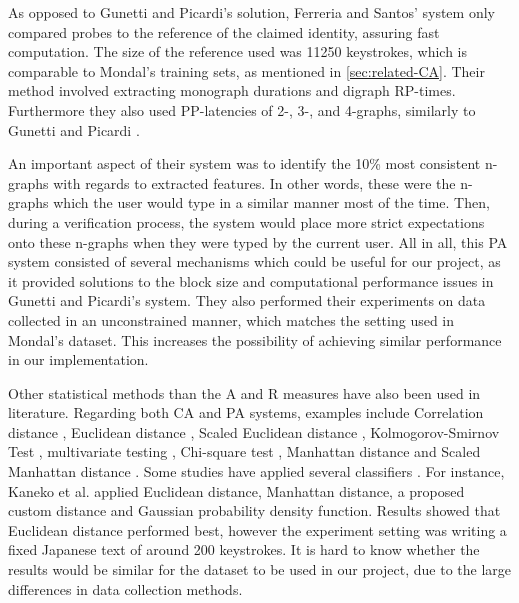 As opposed to Gunetti and Picardi's solution, Ferreria and Santos' system only compared probes to the reference of the claimed identity, assuring fast computation.
The size of the reference used was 11250 keystrokes, which is comparable to Mondal's training sets, as mentioned in \cref{sec:related-CA}.
Their method involved extracting monograph durations and digraph RP-times.
Furthermore they also used PP-latencies of 2-, 3-, and 4-graphs, similarly to Gunetti and Picardi \cite{gnp}.

An important aspect of their system was to identify the 10\% most consistent n-graphs with regards to extracted features.
In other words, these were the n-graphs which the user would type in a similar manner most of the time.
Then, during a verification process, the system would place more strict expectations onto these n-graphs when they were typed by the current user.
All in all, this PA system consisted of several mechanisms which could be useful for our project, as it provided solutions to the block size and computational performance issues in Gunetti and Picardi's \cite{gnp} system.
They also performed their experiments on data collected in an unconstrained manner, which matches the setting used in Mondal's \cite{mondal} dataset. 
This increases the possibility of achieving similar performance in our implementation.

Other statistical methods than the A and R measures have also been used in literature.
Regarding both CA and PA systems, examples include Correlation distance \cite{mondal}, Euclidean distance \cite{Kaneko, Monrose, Harun, Tappert}, Scaled Euclidean distance \cite{mondal}, Kolmogorov-Smirnov Test \cite{park, KANG201572}, multivariate testing \cite{KANG201572}, Chi-square test \cite{chi-square}, Manhattan distance \cite{Kaneko, Harun, cognition} and Scaled Manhattan distance \cite{BOURS201236, Harun}.
Some studies have applied several classifiers \cite{hu, mondal, KANG201572, Harun, cognition, Kaneko}. 
For instance, Kaneko et al. \cite{Kaneko} applied Euclidean distance, Manhattan distance, a proposed custom distance and Gaussian probability density function. Results showed that Euclidean distance performed best, however the experiment setting was writing a fixed Japanese text of around 200 keystrokes.
It is hard to know whether the results would be similar for the dataset to be used in our project, due to the large differences in data collection methods.

